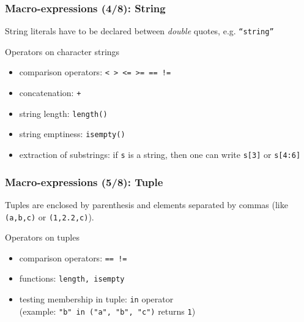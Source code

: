 \documentclass{beamer}
\begin{document}
\begin{frame}[fragile=singleslide]
  \frametitle{Macro-expressions (4/8): String}
  String literals have to be declared between \textit{double} quotes, e.g. \texttt{``string''}
  \begin{block}{Operators on character strings}
    \begin{itemize}
    \item comparison operators: \texttt{< > <= >= == !=}
    \item concatenation: \texttt{+}
    \item string length: \texttt{length()}
    \item string emptiness: \texttt{isempty()}
    \item extraction of substrings: if \texttt{s} is a string, then one can write \texttt{s[3]} or \texttt{s[4:6]}
    \end{itemize}
  \end{block}
\end{frame}

\begin{frame}[fragile=singleslide]
  \frametitle{Macro-expressions (5/8): Tuple}
  Tuples are enclosed by parenthesis and elements separated by commas (like
  \texttt{(a,b,c)} or \texttt{(1,2.2,c)}).
  \begin{block}{Operators on tuples}
    \begin{itemize}
    \item comparison operators: \texttt{== !=}
    \item functions: \texttt{length, isempty}
    \item testing membership in tuple: \texttt{in} operator \\ (example:
      \texttt{"b" in ("a", "b", "c")} returns \texttt{1})
    \end{itemize}
  \end{block}
\end{frame}
\end{document}
